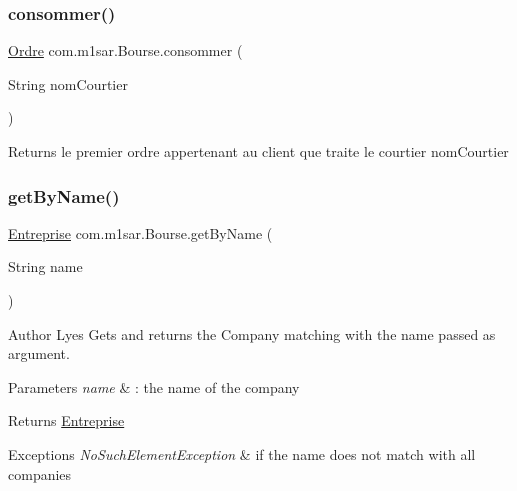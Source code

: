 \subsubsection{\texorpdfstring{consommer()}{consommer()}}
{\footnotesize\ttfamily \hyperlink{classcom_1_1m1sar_1_1_ordre}{Ordre} com.\+m1sar.\+Bourse.\+consommer (\begin{DoxyParamCaption}\item[{String}]{nom\+Courtier }\end{DoxyParamCaption})}

\begin{DoxyReturn}{Returns}
le premier ordre appertenant au client que traite le courtier nom\+Courtier 
\end{DoxyReturn}
\mbox{\label{classcom_1_1m1sar_1_1_bourse_a5b396735aca0672d7f37a2eb098f4edf}} 
\subsubsection{\texorpdfstring{get\+By\+Name()}{getByName()}}
{\footnotesize\ttfamily \hyperlink{classcom_1_1m1sar_1_1_entreprise}{Entreprise} com.\+m1sar.\+Bourse.\+get\+By\+Name (\begin{DoxyParamCaption}\item[{String}]{name }\end{DoxyParamCaption})}

\begin{DoxyAuthor}{Author}
Lyes Gets and returns the Company matching with the name passed as argument. 
\end{DoxyAuthor}

\begin{DoxyParams}{Parameters}
{\em name} & \+: the name of the company \\
\hline
\end{DoxyParams}
\begin{DoxyReturn}{Returns}
{\ttfamily \hyperlink{classcom_1_1m1sar_1_1_entreprise}{Entreprise}} 
\end{DoxyReturn}

\begin{DoxyExceptions}{Exceptions}
{\em No\+Such\+Element\+Exception} & if the name does not match with all companies \\
\hline
\end{DoxyExceptions}
\mbox{\label{classcom_1_1m1sar_1_1_bourse_acdeb99f593d0fdc0743934cb7e692156}} 

